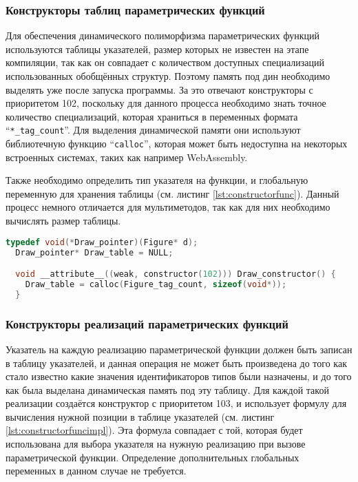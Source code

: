 \subsubsection{Конструкторы таблиц параметрических функций}

Для обеспечения динамического полиморфизма параметрических функций используются таблицы указателей, размер которых не известен на этапе компиляции, так как он совпадает с количеством доступных специализаций использованных обобщённых структур.
Поэтому память под дин необходимо выделять уже после запуска программы.
За это отвечают конструкторы с приоритетом 102, поскольку для данного процесса необходимо знать точное количество специализаций, которая храниться в переменных формата ``\texttt{*_tag_count}''.
Для выделения динамической памяти они используют библиотечную функцию ``\texttt{calloc}'', которая может быть недоступна на некоторых встроенных системах, таких как например WebAssembly.

Также необходимо определить тип указателя на функции, и глобальную переменную для хранения таблицы (см. листинг \ref{lst:constructorfunc}).
Данный процесс немного отличается для мультиметодов, так как для них необходимо вычислять размер таблицы.

\begin{lstlisting}[language=c, caption={Конструктор параметрической функции}, label={lst:constructorfunc}]
  typedef void(*Draw_pointer)(Figure* d);
  Draw_pointer* Draw_table = NULL;

  void __attribute__((weak, constructor(102))) Draw_constructor() {
    Draw_table = calloc(Figure_tag_count, sizeof(void*));
  }
\end{lstlisting}

\subsubsection{Конструкторы реализаций параметрических функций}

Указатель на каждую реализацию параметрической функции должен быть записан в таблицу указателей, и данная операция не может быть произведена до того как стало известно какие значения идентификаторов типов были назначены, и до того как была выделана динамическая память под эту таблицу.
Для каждой такой реализации создаётся конструктор с приоритетом 103, и использует формулу для вычисления нужной позиции в таблице указателей (см. листинг \ref{lst:constructorfuncimpl}).
Эта формула совпадает с той, которая будет использована для выбора указателя на нужную реализацию при вызове параметрической функции.
Определение дополнительных глобальных переменных в данном случае не требуется.

